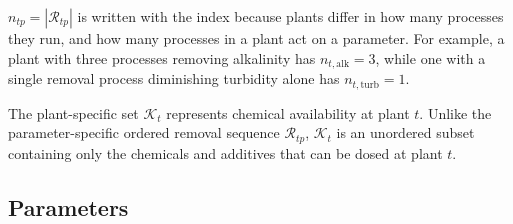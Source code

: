 \documentclass[10pt]{article}
\begin{document}
$n_{tp} = |\mathcal{R}_{tp}|$ is written with the index because plants differ in how many processes they run, and how many processes in a plant act on a parameter.
For example, a plant with three processes removing alkalinity has $n_{t, \mathrm{alk}} = 3$, while one with a single removal process diminishing turbidity alone has $n_{t, \mathrm{turb}} = 1$.

The plant-specific set $\mathcal{K}_t$ represents chemical availability at plant $t$.
Unlike the parameter-specific ordered removal sequence $\mathcal{R}_{tp}$, $\mathcal{K}_t$ is an unordered subset containing only the chemicals and additives that can be dosed at plant $t$.

\subsection{Parameters}
\end{document}

